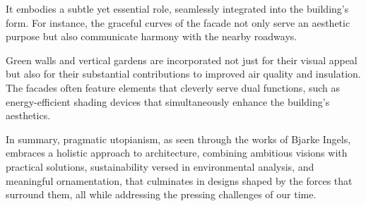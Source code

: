 It embodies a subtle yet essential role, seamlessly integrated into the building's form.
For instance, the graceful curves of the facade not only serve an aesthetic purpose but also communicate harmony with the nearby roadways.

Green walls and vertical gardens are incorporated not just for their visual appeal but also for their substantial contributions to improved air quality and insulation.
The facades often feature elements that cleverly serve dual functions, such as energy-efficient shading devices that simultaneously enhance the building's aesthetics.

In summary, pragmatic utopianism, as seen through the works of Bjarke Ingels, embraces a holistic approach to architecture, combining ambitious visions with practical solutions, sustainability versed in environmental analysis, and meaningful ornamentation, that culminates in designs shaped by the forces that surround them, all while addressing the pressing challenges of our time.









